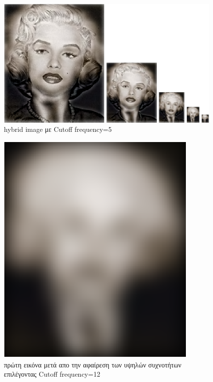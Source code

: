 \documentclass{article}
\newcommand{\tl}[1]{\textlatin{#1}}
\begin{document}
 	\begin{figure}[H]
 		\centering
 		\includegraphics[scale=1]{./res/fig_1_3.eps}
 		\caption{\tl{hybrid image} με \tl{Cutoff frequency}=5}
 	\end{figure}
 
 	\begin{figure}[H]
 		\centering
 		\includegraphics[scale=1]{./res/fig_2_1.eps}
 		\caption{πρώτη εικόνα μετά απο την αφαίρεση των υψηλών συχνοτήτων επιλέγοντας \tl{Cutoff frequency}=12}
 	\end{figure}
 	
\end{document}
